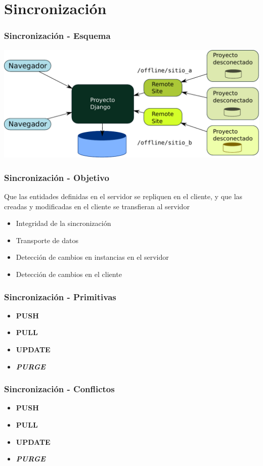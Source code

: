 \documentclass{beamer}
\begin{document}
\section{Sincronización}
\begin{frame}
    \frametitle{Sincronización - Esquema}
    \includegraphics[scale=0.5]{esquema_distribuido.pdf}
\end{frame}

\begin{frame}
    \frametitle{Sincronización - Objetivo}
    \par {
    	Que las entidades definidas en el servidor se repliquen en el cliente, y
    	que las creadas y modificadas en el cliente se transfieran al servidor
    }
    \begin{itemize}
        \item Integridad de la sincronización
		\item Transporte de datos
		\item Detección de cambios en instancias en el servidor
		\item Detección de cambios en el cliente
    \end{itemize}
\end{frame}

\begin{frame}
    \frametitle{Sincronización - Primitivas}
    \begin{itemize}
        \item {\bf PUSH}
        \item {\bf PULL}
        \item {\bf UPDATE}
        \item \textit{\bf PURGE}
    \end{itemize}
\end{frame}

\begin{frame}


    \frametitle{Sincronización - Conflictos}
    \begin{itemize}
        \item {\bf PUSH}
        \item {\bf PULL}
        \item {\bf UPDATE}
        \item \textit{\bf PURGE}
    \end{itemize}
\end{frame}
\end{document}
